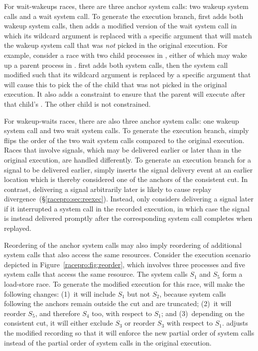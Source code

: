 For wait-wakeups races, there are three anchor system calls: two wakeup
system calls and a wait system call. To generate the execution branch,
\racepro first adds both wakeup system calls, then adds a modified version
of the wait system call in which its wildcard argument is replaced
with a specific argument that will match the wakeup system call that
was \emph{not} picked in the original execution.  For example, consider
a race with two child processes in , either of which may wake
up a parent process in .  \racepro first adds both 
system calls, then the  system call modified such that its
wildcard argument is replaced by a specific argument that will cause
this  to pick the  of the child that was
not picked in the original execution. It also adds a constraint
to ensure that the parent will execute after that child's .
The other child is not constrained.

For wakeup-waits races, there are also three anchor system calls: one
wakeup system call and two wait system calls. To generate the
execution branch, \racepro simply flips the order of the two wait system
calls compared to the original execution.  Races that involve signals,
which may be delivered earlier or later than in the original
execution, are handled differently.  To generate an execution branch
for a signal to be delivered earlier, \racepro simply inserts the signal
delivery event at an earlier location which is thereby considered one
of the anchors of the consistent cut.  In contrast, delivering a
signal arbitrarily later is likely to cause replay
divergence~(\S\ref{racepro:sec:reexec}).  Instead, \racepro only considers
delivering a signal later if it interrupted a system call in the
recorded execution, in which case the signal is instead delivered
promptly after the corresponding system call completes when replayed. 

Reordering of the anchor system calls may also imply reordering of
additional system calls that also access the same resources. Consider
the execution scenario depicted in Figure~\ref{racepro:fig:reorder}, which
involves three processes and five system calls that access the same
resource. The system calls $S_1$ and $S_5$ form a load-store race. To
generate the modified execution for this race, \racepro will make the
following changes: (1)~it will include $S_1$ but not $S_2$, because
system calls following the anchors remain outside the cut and are
truncated; (2)~it will reorder $S_5$, and therefore $S_4$ too, with
respect to $S_1$; and (3)~depending on the consistent cut, it will
either exclude $S_3$ or reorder $S_3$ with respect to $S_1$.
\racepro adjusts the modified recording so that it will enforce the new
partial order of system calls instead of the partial order of system
calls in the original execution.

